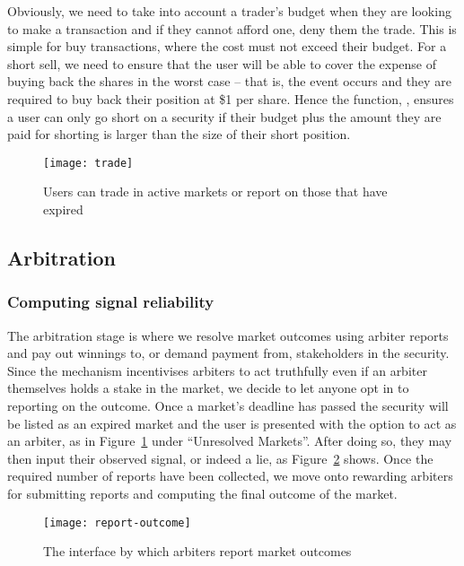 Obviously, we need to take into account a trader's budget when they are looking
to make a transaction and if they cannot afford one, deny them the trade. This
is simple for buy transactions, where the cost must not exceed their budget.
For a short sell, we need to ensure that the user will be able to cover the
expense of buying back the shares in the worst case -- that is, the event
occurs and they are required to buy back their position at \$1 per share. Hence
the function, , ensures a user can only go short on a
security if their budget plus the amount they are paid for shorting is larger
than the size of their short position.

\begin{figure}[h]
	\centering
	\texttt{[image: trade]}
	\caption{Users can trade in active markets or report on those that have
	expired}
	\label{fig:trade}
\end{figure}

\subsection{Arbitration}

\label{sec:arbitration}

\subsubsection{Computing signal reliability}

The arbitration stage is where we resolve market outcomes using arbiter reports
and pay out winnings to, or demand payment from, stakeholders in the security.
Since the mechanism incentivises arbiters to act truthfully even if an arbiter
themselves holds a stake in the market, we decide to let anyone opt in to
reporting on the outcome. Once a market's deadline has passed the security will
be listed as an expired market and the user is presented with the option to act
as an arbiter, as in Figure~\ref{fig:trade} under ``Unresolved Markets''. After
doing so, they may then input their observed signal, or indeed a lie, as
Figure~\ref{fig:reportOutcome} shows. Once the required number of reports have
been collected, we move onto rewarding arbiters for submitting reports and
computing the final outcome of the market.

\begin{figure}[h]
	\centering
	\texttt{[image: report-outcome]}
	\caption{The interface by which arbiters report market outcomes}
	\label{fig:reportOutcome}
\end{figure}

